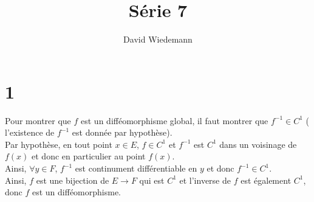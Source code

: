 \documentclass[11pt, a4paper, twoside]{article}
\begin{document}
\title{Série 7}
\author{David Wiedemann}
\maketitle
\section*{1}
Pour montrer que $f$ est un difféomorphisme global, il faut montrer que $f^{-1} \in C^{1}$ ( l'existence de $f^{-1}$ est donnée par hypothèse).\\
Par hypothèse, en tout point $x\in E$, $f\in C^{1}$ et $f^{-1}$ est $C^{1}$ dans un voisinage de $f( x) $ et donc en particulier au point $f( x) $.\\
Ainsi, $\forall y \in F$, $f^{-1}$ est continument différentiable en $y$ et donc $f^{-1}\in C^{1}$.\\
Ainsi, $f$ est une bijection de $E\to F$ qui est $C^{1}$ et l'inverse de $f$ est également $C^{1}$, donc $f$ est un difféomorphisme.
\end{document}
